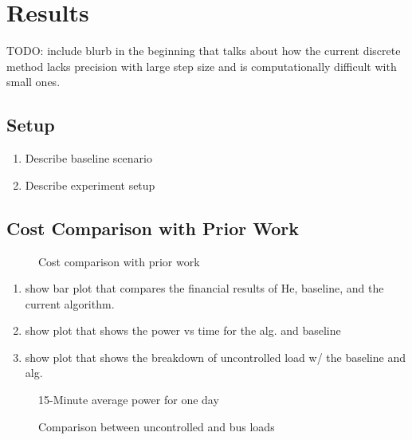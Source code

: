 \section{Results\label{sec:results}}
TODO: include blurb in the beginning that talks about how the current discrete method lacks precision with large step size and is computationally difficult with small ones.
\subsection{Setup}
\begin{enumerate}
	\item Describe baseline scenario
	\item Describe experiment setup
\end{enumerate}

\subsection{Cost Comparison with Prior Work} 
\begin{figure}
	\centering
	\caption{Cost comparison with prior work}
	\label{fig:costComparison}
\end{figure}

\begin{enumerate}
	\item show bar plot that compares the financial results of He, baseline, and the current algorithm.
	\item show plot that shows the power vs time for the alg. and baseline
	\item show plot that shows the breakdown of uncontrolled load w/ the baseline and alg.
\end{enumerate} 

\begin{figure*}
	\centering
	\caption{15-Minute average power for one day}
	\label{fig:totalPower}
\end{figure*}
\begin{figure*}
	\centering
	\caption{Comparison between uncontrolled and bus loads}
	\label{fig:powerPlot}
\end{figure*}

